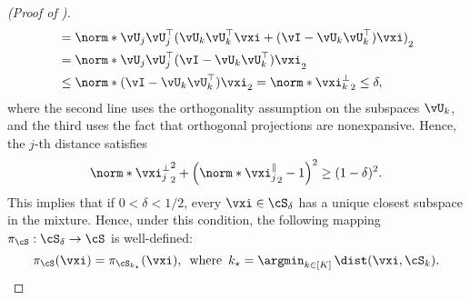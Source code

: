 \documentclass[../../book-main.tex]{subfiles}
\begin{document}
\begin{proof}[(Proof of )]
\begin{align}
        &=
        \norm*{
            \vU_j \vU_j^\top( \vU_k \vU_k^\top \vxi + (\vI - \vU_k \vU_k^\top)
            \vxi )
        }_2
        \\
        &=
        \norm*{
            \vU_j \vU_j^\top (\vI - \vU_k \vU_k^\top) \vxi
        }_2
        \\
        &\leq
        \norm*{
            (\vI - \vU_k \vU_k^\top) \vxi
        }_2
        =
        \norm*{
            \vxi_k^{\perp}
        }_2
        \leq \delta,
    \end{align}
    where the second line uses the orthogonality assumption on the subspaces
    $\vU_k$, and the third uses the fact that orthogonal projections are
    nonexpansive.
    Hence, the $j$-th distance satisfies
    \begin{equation}
        \norm*{\vxi^{\perp}_j}_2^2
        + \left( \norm*{\vxi^{\|}_j}_2 - 1 \right)^2
        \geq
        (1 - \delta)^2.
    \end{equation}
    This implies that if $0 < \delta < 1/2$, every $\vxi \in \cS_{\delta}$ has
    a unique closest subspace in the mixture.
    Hence, under this condition, the following mapping $\pi_{\cS} : \cS_{\delta}
    \to \cS$ is well-defined:
    \begin{equation}
        \pi_{\cS}(\vxi) 
        =
        \pi_{\cS_{k_\star}}(\vxi),
        \enspace\text{where}\enspace
        k_{\star} = \argmin_{k \in [K]}\,
        \dist(\vxi, \cS_{k}).
    \end{equation}



\end{proof}
\end{document}
